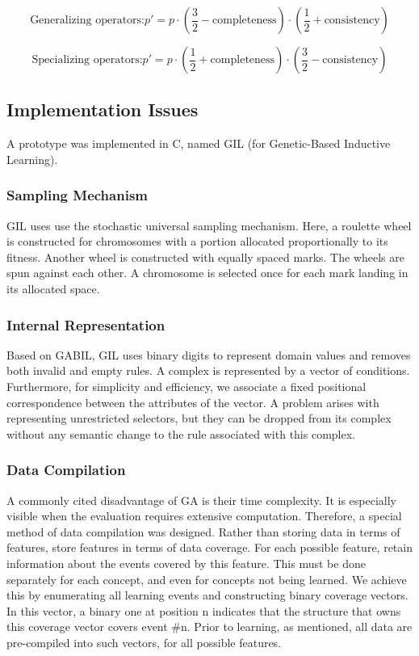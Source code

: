 \documentclass[../main.tex]{subfiles}
\begin{document}
\begin{equation}
	\text{Generalizing operators:} p' = p \cdot \left( \frac{3}{2} - \text{completeness} \right) \cdot \left( \frac{1}{2} + \text{consistency} \right)
\end{equation}

\begin{equation}
	\text{Specializing operators:} p' = p \cdot \left( \frac{1}{2} + \text{completeness} \right) \cdot \left( \frac{3}{2} - \text{consistency} \right)
\end{equation}

\subsection{Implementation Issues}

A prototype was implemented in C, named GIL (for Genetic-Based Inductive Learning).

\subsubsection{Sampling Mechanism}

GIL uses use the stochastic universal sampling mechanism. Here, a roulette wheel is constructed for chromosomes with a portion allocated proportionally to its fitness. Another wheel is constructed with equally spaced marks. The wheels are spun against each other. A chromosome is selected once for each mark landing in its allocated space.

\subsubsection{Internal Representation}

Based on GABIL, GIL uses  binary digits to represent domain values and removes both invalid and empty rules. A complex
is represented by a vector of conditions. Furthermore, for simplicity and efficiency, we associate a fixed positional
correspondence between the attributes of the vector. A problem arises with representing unrestricted selectors, but
they can be dropped from its complex without any semantic change to the rule associated with this complex.

\subsubsection{Data Compilation}
A commonly cited disadvantage of GA is their time complexity. It is especially visible when the evaluation requires
extensive computation. Therefore, a special method of data compilation was designed. Rather than storing data in terms
of features, store features in terms of data coverage. For each possible feature, retain information about the events
covered by this feature. This must be done separately for each concept, and even for concepts not being learned. We
achieve this by enumerating all learning events and constructing binary coverage vectors. In this vector, a binary one
at position n indicates that the structure that owns this coverage vector covers event \#n. Prior to learning, as
mentioned, all data are pre-compiled into such vectors, for all possible features.
\end{document}
